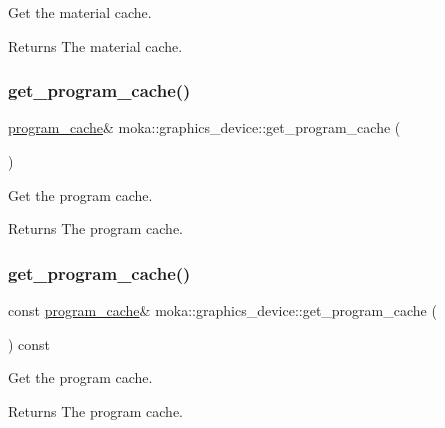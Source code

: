 Get the material cache. 

\begin{DoxyReturn}{Returns}
The material cache. 
\end{DoxyReturn}
\mbox{\label{classmoka_1_1graphics__device_af4b5a98ad455812b96fe7cd3d638b81d}} 
\subsubsection{\texorpdfstring{get\_program\_cache()}{get\_program\_cache()}\hspace{0.1cm}{\footnotesize\ttfamily [1/2]}}
{\footnotesize\ttfamily \mbox{\hyperlink{classmoka_1_1program__cache}{program\+\_\+cache}}\& moka\+::graphics\+\_\+device\+::get\+\_\+program\+\_\+cache (\begin{DoxyParamCaption}{ }\end{DoxyParamCaption})}



Get the program cache. 

\begin{DoxyReturn}{Returns}
The program cache. 
\end{DoxyReturn}
\mbox{\label{classmoka_1_1graphics__device_ac75770427381cfe146dcf1244a461b27}} 
\subsubsection{\texorpdfstring{get\_program\_cache()}{get\_program\_cache()}\hspace{0.1cm}{\footnotesize\ttfamily [2/2]}}
{\footnotesize\ttfamily const \mbox{\hyperlink{classmoka_1_1program__cache}{program\+\_\+cache}}\& moka\+::graphics\+\_\+device\+::get\+\_\+program\+\_\+cache (\begin{DoxyParamCaption}{ }\end{DoxyParamCaption}) const}



Get the program cache. 

\begin{DoxyReturn}{Returns}
The program cache. 
\end{DoxyReturn}
\mbox{\label{classmoka_1_1graphics__device_a11cc5af3339a854119c1e6d4e314535b}} 
